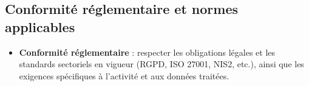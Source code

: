 \subsection*{Conformité réglementaire et normes applicables}

\begin{itemize}
	\item \textbf{Conformité réglementaire} : respecter les obligations légales et les standards sectoriels en vigueur (RGPD, ISO 27001, NIS2, etc.), ainsi que les exigences spécifiques à l'activité et aux données traitées.
\end{itemize}






